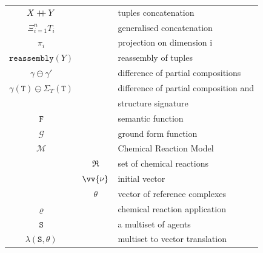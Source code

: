 \documentclass[12pt]{fithesis2}
\newcommand\mdoubleplus{\mathbin{+\mkern-7mu+}}
\begin{document}
\begin{tabular}{c c | l}
$X \mdoubleplus Y$ & & tuples concatenation\\
$\Xi_{i=1}^n T_i$ & & generalised concatenation\\
$\pi_i$ & & projection on dimension i\\
$\mathtt{reassembly}(Y)$ & & reassembly of tuples\\
$\gamma \ominus \gamma'$ & & difference of partial compositions\\
$\gamma(\mathtt{T}) \ominus \Sigma_T(\mathtt{T})$ & & difference of partial composition and\\
 & & structure signature\\
$\mathtt{F}$ & & semantic function\\
$\mathcal{G}$ & & ground form function\\
$\mathcal{M}$ & & Chemical Reaction Model\\
 & $\mathfrak{R}$ & set of chemical reactions\\
 & $\vv{\nu}$ & initial vector\\
 & $\theta$ & vector of reference complexes\\
$\varrho$ & & chemical reaction application\\
$\mathtt{S}$ & & a multiset of agents\\
$\lambda(\mathtt{S}, \theta)$ & & multiset to vector translation\\
\end{tabular}
\end{document}
